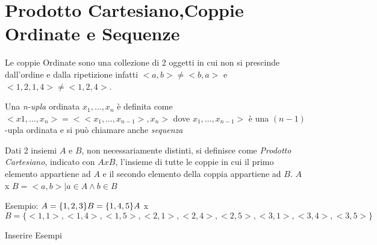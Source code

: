 \section{Prodotto Cartesiano,Coppie Ordinate e Sequenze}
Le coppie Ordinate sono una collezione di 2 oggetti in cui non si prescinde
dall'ordine e dalla ripetizione infatti $<a,b> \neq <b,a>$ e $<1,2,1,4> \neq <1,2,4>$.

Una \emph{n-upla} ordinata $x_1,\dots,x_n$ è definita come $<x1,\dots,x_n> = < <x_1,\dots,x_{n-1}>,x_n>$
dove $x_1,\dots,x_{n-1}>$ è una $(n-1)$-upla ordinata e si può chiamare anche \emph{sequenza}

Dati 2 insiemi $A$ e $B$, non necessariamente  distinti, si definisce come \textit{Prodotto Cartesiano},
indicato con $A x B$, l'insieme di tutte le coppie in cui il primo elemento appartiene ad $A$
e il secondo elemento della coppia appartiene ad $B$.\newline
$A$ x $B = {<a,b> | a \in A \land b \in B} $

Esempio:\newline
$A = \{1,2,3\} \newline
B = \{1,4,5\} \newline
A$ x $B = \{<1,1>,<1,4>,<1,5>,<2,1>,<2,4>,<2,5>,<3,1>,<3,4>,<3,5>\} $


Inserire Esempi
